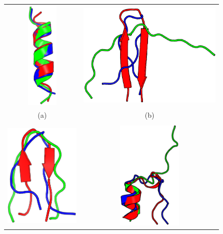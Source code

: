 \begin{figure}
\centering
\begin{tabular}{c c}
\includegraphics[height=5.2cm]{images/rmsd-1DEP.png} & \includegraphics[height=5.2cm]{images/rmsd-1E0Q.png} \\
(a) & (b) \\ \\
\includegraphics[height=5.2cm]{images/rmsd-1K43.png} & \includegraphics[height=5.2cm]{images/rmsd-1L2Y.png} \\

\end{tabular}
\end{figure}
